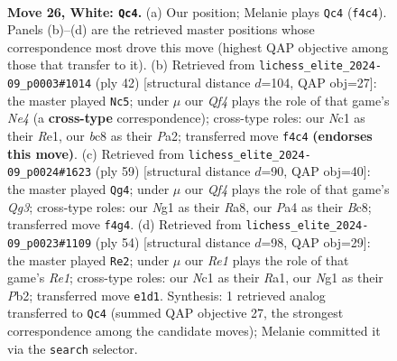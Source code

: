\documentclass[11pt]{article}
\begin{document}
\begin{figure}[p]\centering
\begin{subfigure}{0.46\textwidth}\centering
\resizebox{\linewidth}{!}{%
\newchessgame
\chessboard[
  setfen={r1b1rk2/3q3p/ppn2Pp1/2p1p3/P4Q2/2P2P2/6PP/1KN1RBNR w - - 0 26},
  showmover=false,
  pgfstyle=straightmove, color=movearrow, markmove={f4-c4}
]}
\caption{}
\end{subfigure}\hfill
\begin{subfigure}{0.46\textwidth}\centering
\resizebox{\linewidth}{!}{%
\newchessgame
\chessboard[
  setfen={r4r1k/1pq2bpp/pnp2p2/8/3PN3/1B3Q1P/PP3PP1/2R1R1K1 w - - 1 22},
  showmover=false,
  pgfstyle=straightmove, color=movearrow, markmove={e4-c5}
]}
\caption{}
\end{subfigure}
\\[4pt]
\begin{subfigure}{0.46\textwidth}\centering
\resizebox{\linewidth}{!}{%
\newchessgame
\chessboard[
  setfen={r1b1r1k1/p4pp1/2P3qp/3p3P/Q2Nn3/4P3/1PR2PP1/4KB1R b K - 0 30},
  showmover=false,
  pgfstyle=straightmove, color=movearrow, markmove={g6-g4}
]}
\caption{}
\end{subfigure}\hfill
\begin{subfigure}{0.46\textwidth}\centering
\resizebox{\linewidth}{!}{%
\newchessgame
\chessboard[
  setfen={4rnk1/pq2r1b1/2p3p1/2ppp1N1/P5Q1/2PP2P1/1P4KP/R1B1R3 w - - 6 28},
  showmover=false,
  pgfstyle=straightmove, color=movearrow, markmove={e1-e2}
]}
\caption{}
\end{subfigure}
\caption{\textbf{Move 26, White: \texttt{Qc4}.} (a) Our position; Melanie plays \texttt{Qc4} (\texttt{f4c4}). Panels (b)--(d) are the retrieved master positions whose correspondence most drove this move (highest QAP objective among those that transfer to it). (b) Retrieved from \texttt{lichess\_elite\_2024-09\_p0003\#1014} (ply 42) [structural distance $d$=104, QAP obj=27]: the master played \texttt{Nc5}; under $\mu$ our \emph{Qf4} plays the role of that game's \emph{Ne4} (a \textbf{cross-type} correspondence); cross-type roles: our \emph{N}c1 as their \emph{R}e1, our \emph{b}c8 as their \emph{P}a2; transferred move \texttt{f4c4} \textbf{(endorses this move)}. (c) Retrieved from \texttt{lichess\_elite\_2024-09\_p0024\#1623} (ply 59) [structural distance $d$=90, QAP obj=40]: the master played \texttt{Qg4}; under $\mu$ our \emph{Qf4} plays the role of that game's \emph{Qg3}; cross-type roles: our \emph{N}g1 as their \emph{R}a8, our \emph{P}a4 as their \emph{B}c8; transferred move \texttt{f4g4}. (d) Retrieved from \texttt{lichess\_elite\_2024-09\_p0023\#1109} (ply 54) [structural distance $d$=98, QAP obj=29]: the master played \texttt{Re2}; under $\mu$ our \emph{Re1} plays the role of that game's \emph{Re1}; cross-type roles: our \emph{N}c1 as their \emph{R}a1, our \emph{N}g1 as their \emph{P}b2; transferred move \texttt{e1d1}. Synthesis: 1 retrieved analog transferred to \texttt{Qc4} (summed QAP objective 27, the strongest correspondence among the candidate moves); Melanie committed it via the \texttt{search} selector.}
\label{fig:thought-m50}
\end{figure}
\end{document}
